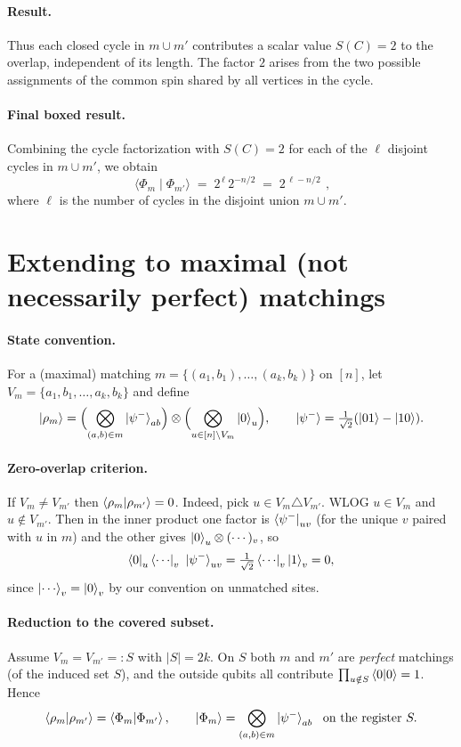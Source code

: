 \documentclass[11pt]{article}
\newcommand{\ip}[2]{\langle #1 \mid #2 \rangle}
\begin{document}
\paragraph{Result.}
Thus each closed cycle in $m\cup m'$ contributes a scalar value $S(C)=2$ to the
overlap, independent of its length. The factor $2$ arises from the two possible
assignments of the common spin shared by all vertices in the cycle.


\paragraph{Final boxed result.}
Combining the cycle factorization with $S(C)=2$ for each of the $\ell$ disjoint cycles in $m\cup m'$, we obtain
\[
\boxed{\ \ip{\Phi_m}{\Phi_{m'}}\;=\;2^{\,\ell}\,2^{-n/2}\;=\;2^{\,\ell - n/2}\ }\,,
\]
where $\ell$ is the number of cycles in the disjoint union $m\cup m'$.

\pagebreak 

\section*{Extending to maximal (not necessarily perfect) matchings}

\paragraph{State convention.}
For a (maximal) matching $m=\{(a_1,b_1),\dots,(a_k,b_k)\}$ on $[n]$,
let $V_m=\{a_1,b_1,\dots,a_k,b_k\}$ and define
\[
\ket{\rho_m}
=\Bigl(\bigotimes_{(a,b)\in m}\ket{\psi^-}_{ab}\Bigr)
\otimes \Bigl(\bigotimes_{u\in [n]\setminus V_m}\ket{0}_u\Bigr),
\qquad
\ket{\psi^-}=\tfrac{1}{\sqrt{2}}(\ket{01}-\ket{10}).
\]

\paragraph{Zero-overlap criterion.}
If $V_m\neq V_{m'}$ then $\braket{\rho_m|\rho_{m'}}=0$.
Indeed, pick $u\in V_m\triangle V_{m'}$. WLOG $u\in V_m$ and $u\notin V_{m'}$.
Then in the inner product one factor is $\bra{\psi^-}_{uv}$ (for the unique $v$ paired with $u$ in $m$)
and the other gives $\ket{0}_u\otimes(\cdots)_v$, so
\[
\bra{0}_u\bra{\cdots}_v\ \ket{\psi^-}_{uv}
=\tfrac{1}{\sqrt{2}}\bra{\cdots}_v\ket{1}_v=0,
\]
since $\ket{\cdots}_v=\ket{0}_v$ by our convention on unmatched sites.

\paragraph{Reduction to the covered subset.}
Assume $V_m=V_{m'}=:S$ with $|S|=2k$.
On $S$ both $m$ and $m'$ are \emph{perfect} matchings (of the induced set $S$), and the
outside qubits all contribute $\prod_{u\notin S}\braket{0|0}=1$.
Hence
\[
\braket{\rho_m|\rho_{m'}}=\braket{\Phi_m|\Phi_{m'}},
\qquad
\ket{\Phi_m}=\bigotimes_{(a,b)\in m}\ket{\psi^-}_{ab}
\ \text{ on the register } S.
\]
\end{document}
